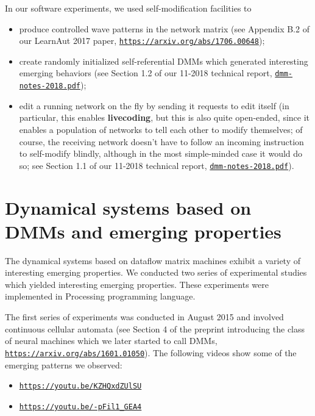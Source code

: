 \documentclass{article}
\begin{document}
\vspace{0.1in}
\noindent
In our software experiments, we used self-modification facilities to

  \begin{itemize}
     \item produce controlled wave patterns in the network matrix (see Appendix B.2 of our LearnAut 2017 paper, \href{https://arxiv.org/abs/1706.00648}{\tt https://arxiv.org/abs/1706.00648});
     \item create randomly initialized self-referential DMMs which generated interesting emerging behaviors (see Section 1.2 of our 11-2018 technical report, \href{https://www.cs.brandeis.edu/~bukatin/dmm-notes-2018.pdf}{\tt dmm-notes-2018.pdf});
     \item edit a running network on the fly by sending it requests to edit itself (in particular, this enables {\bf livecoding}, but this is also quite open-ended, since it enables a population of networks to tell each other to modify themselves; of course, the receiving network doesn't have to follow an incoming instruction to self-modify blindly, although in the most simple-minded case it would do so; see Section 1.1 of our 11-2018 technical report, \href{https://www.cs.brandeis.edu/~bukatin/dmm-notes-2018.pdf}{\tt dmm-notes-2018.pdf}).
  \end{itemize}

\section{Dynamical systems based on DMMs and emerging properties}

The dynamical systems based on dataflow
matrix machines exhibit a variety of interesting emerging properties. We conducted two series of experimental studies which yielded interesting emerging properties. These experiments were implemented in Processing programming language.

The first series of experiments was conducted in August 2015 and involved continuous cellular automata (see Section 4 of the preprint introducing the class of neural machines which we later started to call DMMs, \href{https://arxiv.org/abs/1601.01050}{\tt https://arxiv.org/abs/1601.01050}). The following videos show some of the emerging patterns we observed:

\begin{itemize}
   \item \href{https://youtu.be/KZHQxdZUlSU}{\tt https://youtu.be/KZHQxdZUlSU}
   \item \href{https://youtu.be/-pFil1\_GEA4}{\tt https://youtu.be/-pFil1\_GEA4}
\end{itemize}
\end{document}
